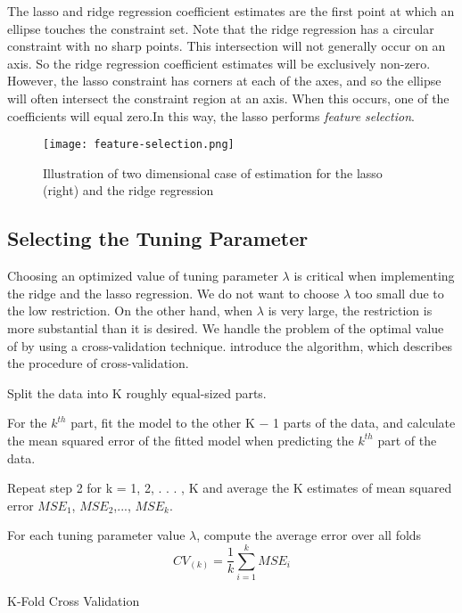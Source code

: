 The lasso and ridge regression coefficient estimates are the first point at
which an ellipse touches the constraint set.
Note that the ridge regression has a circular constraint with no sharp points.
This intersection will not generally occur on an axis. So the ridge regression
coefficient estimates will be exclusively non-zero. However, the lasso
constraint has corners at each of the axes, and so the ellipse will often
intersect the constraint region at an axis. When this occurs, one of the
coefficients will equal zero.In this way, the lasso performs \textit{feature
selection}.
\begin{figure}[H]\centering
    \caption{Illustration of two dimensional case of estimation for the lasso
    (right) and the ridge regression}
    \label{fig:feature-selection}
    \texttt{[image: feature-selection.png]}
\end{figure}
\vspace{1mm}
\subsection{Selecting the Tuning Parameter}

Choosing an optimized value of tuning parameter $\lambda$ is critical when
implementing the ridge and the lasso regression.
We do not want to choose $\lambda$ too small due to the low restriction. On the
other hand, when $\lambda$ is very large, the restriction is more substantial
than it is desired. We handle the problem of the optimal value of  by using a
cross-validation technique. \textcite{efron1994introduction} introduce the algorithm, which describes
the procedure of cross-validation.

\begin{algorithm}[H]
\SetAlgoLined
\renewcommand{\labelenumi}{(\Roman{enumi})}
Split the data into K roughly equal-sized parts.

For the $k^{th}$ part, fit the model to the other K − 1 parts of the data, and
calculate the mean squared error of the fitted model when predicting the
$k^{th}$ part of the data.

Repeat step 2 for k = 1, 2, . . . , K and average the K estimates of mean
squared error $MSE_1$, $MSE_2$,..., $MSE_k$.

For each tuning parameter value $\lambda$, compute the average error over all
folds \[CV_{(k)} = \frac{1}{k} \sum_{i=1}^{k} MSE_i\]

 \caption{K-Fold Cross Validation}
\end{algorithm}


